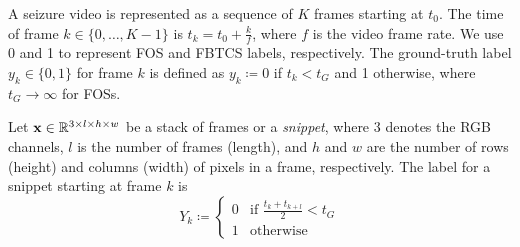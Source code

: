 A seizure video is represented as a sequence of $K$ frames starting at $t_0$.
The time of frame $k \in \{ 0, \dots, K - 1 \}$ is ${t_k = t_0 + \frac{k}{f}}$, where $f$ is the video frame rate.
We use 0 and 1 to represent \ac{FOS} and \ac{FBTCS} labels, respectively.
The ground-truth label $y_k \in \{0, 1\}$ for frame $k$ is defined as $y_k \coloneqq 0$ if $t_k < t_G$ and 1 otherwise, where $t_G \rightarrow \infty$ for \acp{FOS}.

Let $\mathbf{x} \in \mathbb{R} ^ {3 \times l \times h \times w}$ be a stack of frames or a \textit{snippet}, where
$3$ denotes the \ac{RGB} channels,
$l$ is the number of frames (length),
and $h$ and $w$ are the number of rows (height) and columns (width) of pixels in a frame, respectively.
The label for a snippet starting at frame $k$ is
\begin{equation}
  Y_k \coloneqq
  \left\{
    \begin{array}{ll}
      0 & \mbox{if } \frac{t_k + t_{k + l}}{2} < t_G \\
      1 & \mbox{otherwise}
    \end{array}
  \right.
\end{equation}
